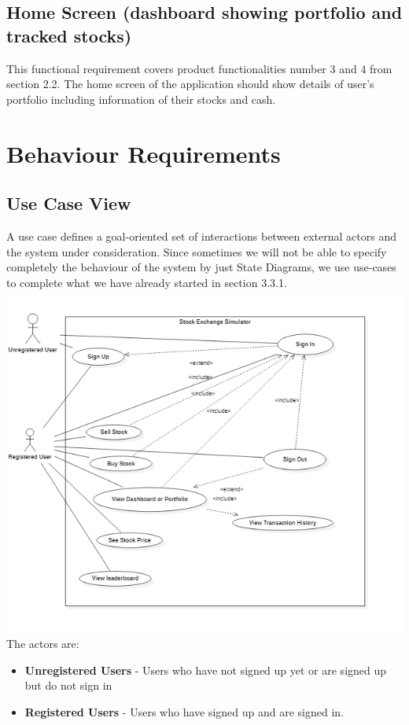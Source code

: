 \documentclass[12 pt, a4paper]{report}
\begin{document}
	
	\subsection{Home Screen (dashboard showing portfolio and tracked stocks)}
	This functional requirement covers product functionalities number 3 and 4 from section 2.2. The home screen of the application should show details of user's portfolio including information of their stocks and cash.

	\section {Behaviour Requirements}

	\subsection {Use Case View}

	A use case defines a goal-oriented set of interactions between external actors and the system under consideration. Since sometimes we will not be able to specify completely the behaviour of the system by just State Diagrams, we use use-cases to complete what we have already started in section 3.3.1. 
\includegraphics{usecase}
The actors are:
\begin{itemize}
\item \textbf{Unregistered Users} - Users who have not signed up yet or are signed up but do not sign in
\item \textbf{Registered Users} - Users who have signed up and are signed in.
\end{itemize}
\end{document}
